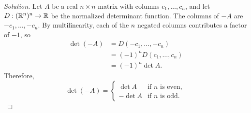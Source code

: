 \begin{proof}[Solution]
Let \(A\) be a real \(n\times n\) matrix with columns \(c_1,\ldots,c_n\),
and let \(D:(\mathbb{R}^n)^n\to\mathbb{R}\) be the normalized determinant function.
The columns of \(-A\) are \(-c_1,\ldots,-c_n\). By multilinearity,
each of the \(n\) negated columns contributes a factor of \(-1\), so
\begin{align*}
  \det(-A)&=D(-c_1,\ldots,-c_n)\\
    &=(-1)^nD(c_1,\ldots,c_n)\\
    &=(-1)^n\det A.
\end{align*}
Therefore,
\[
  \det(-A)=
  \begin{cases}
    \det A & \text{if \(n\) is even},\\
    -\det A & \text{if \(n\) is odd}.
  \end{cases}
\]
\end{proof}
